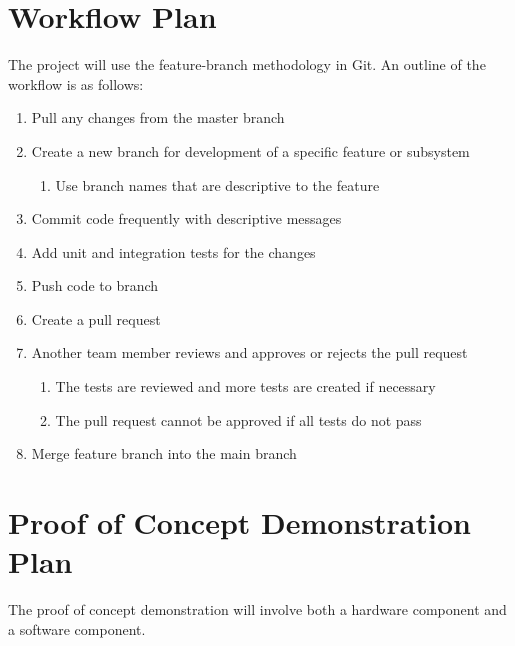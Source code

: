 \documentclass{article}
\begin{document}
\section{Workflow Plan}
{The project will use the feature-branch methodology in Git. An outline of the workflow is as follows:}
\begin{enumerate}
    \item Pull any changes from the master branch
    \item Create a new branch for development of a specific feature or subsystem
        \begin{enumerate}
            \item Use branch names that are descriptive to the feature
        \end{enumerate}
    \item Commit code frequently with descriptive messages
    \item Add unit and integration tests for the changes
    \item Push code to branch
    \item Create a pull request
    \item Another team member reviews and approves or rejects the pull request
        \begin{enumerate}
            \item The tests are reviewed and more tests are created if necessary
            \item The pull request cannot be approved if all tests do not pass
        \end{enumerate}
    \item Merge feature branch into the main branch
\end{enumerate}

\section{Proof of Concept Demonstration Plan}


The proof of concept demonstration will involve both a hardware component and a software component.
\end{document}
